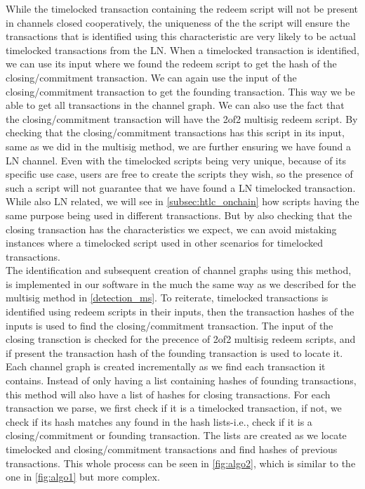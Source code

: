 While the timelocked transaction containing the redeem script will not be present in channels closed cooperatively, 
the uniqueness of the the script will ensure the transactions that is identified using this characteristic are very likely to be actual timelocked transactions from the LN.
When a timelocked transaction is identified, we can use its input where we found the redeem script to get the hash of the closing/commitment transaction.
We can again use the input of the closing/commitment transaction to get the founding transaction. 
This way we be able to get all transactions in the channel graph.
We can also use the fact that the closing/commitment transaction will have the 2of2 multisig redeem script.
By checking that the closing/commitment transactions has this script in its input, same as we did in the multisig method, we are further ensuring we have found a LN channel.
Even with the timelocked scripts being very unique, because of its specific use case, users are free to create the scripts they wish, so the presence of such a script will not guarantee that we have found a LN timelocked transaction.
While also LN related, we will see in \cref{subsec:htlc_onchain} how scripts having the same purpose being used in different transactions.
But by also checking that the closing transaction has the characteristics we expect, we can avoid mistaking instances where a timelocked script used in other scenarios for timelocked transactions.
\\

The identification and subsequent creation of channel graphs using this method, is implemented in our software in the much the same way as we described for the multisig method in \cref{detection_ms}.
To reiterate, timelocked transactions is identified using redeem scripts in their inputs, then the transaction hashes of the inputs is used to find the closing/commitment transaction.
The input of the closing transction is checked for the precence of 2of2 multisig redeem scripts, and if present the transaction hash of the founding transaction is used to locate it.
Each channel graph is created incrementally as we find each transaction it contains.
Instead of only having a list containing hashes of founding transactions, this method will also have a list of hashes for closing transactions.
For each transaction we parse, we first check if it is a timelocked transaction, if not, we check if its hash matches any found in the hash lists-i.e., check if it is a closing/commitment or founding transaction.
The lists are created as we locate timelocked and closing/commitment transactions and find hashes of previous transactions.
This whole process can be seen in \cref{fig:algo2}, which is similar to the one in \cref{fig:algo1} but more complex.

